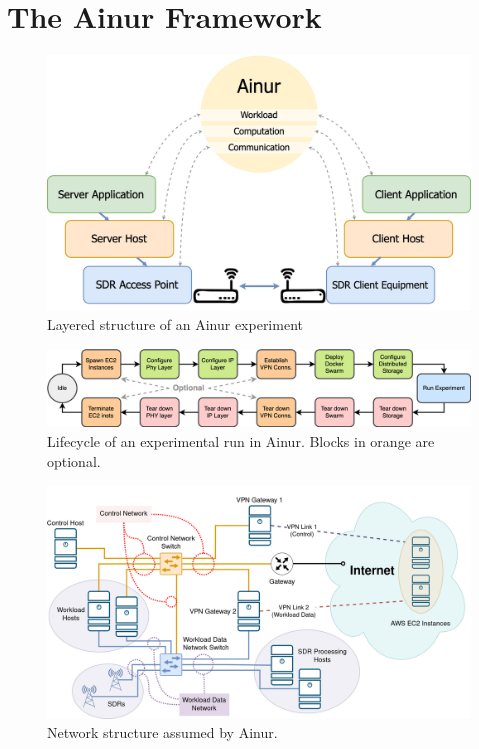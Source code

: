 \section{The Ainur Framework}\label{paper:olguinmunoz2022airnur:ainur}

\begin{figure}[t]
    \centering
    \includegraphics[width=\textwidth]{publications/2022Ainur/figures/overview}
    \caption{Layered structure of an Ainur experiment}\label{paper:olguinmunoz2022airnur:fig:overview}
\end{figure}

\begin{figure}
    \centering
    \includegraphics[width=\textwidth]{publications/2022Ainur/figures/flow2}
    \caption{Lifecycle of an experimental run in Ainur. Blocks in orange are optional.}\label{paper:olguinmunoz2022airnur:fig:flow}
\end{figure}

\begin{figure}
    \centering
    \includegraphics[width=\textwidth]{publications/2022Ainur/figures/network}
    \caption{Network structure assumed by Ainur.}\label{paper:olguinmunoz2022airnur:fig:network}
\end{figure}

